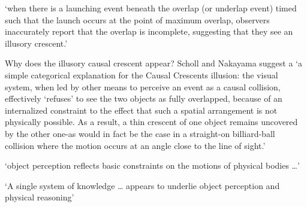 \documentclass[12pt]{extarticle}
\begin{document}
\begin{multicols*}{3}
‘when there is a launching event beneath the overlap (or underlap event) timed such that
the launch occurs at the point of maximum overlap, observers inaccurately report that
the overlap is incomplete, suggesting that they see an illusory crescent.’
\citep[p.\ 461]{Scholl:2004dx}

Why does the illusory causal crescent appear?  Scholl and Nakayama suggest a
‘a simple categorical explanation for the Causal Crescents illusion: the visual system,
when led by other means to perceive an event as a causal collision, effectively
‘refuses’ to see the two objects as fully overlapped, because of an internalized
constraint to the effect that such a spatial arrangement is not physically possible.
As a result, a thin crescent of one object remains uncovered by the other one-as
would in fact be the case in a straight-on billiard-ball collision where the motion
occurs at an angle close to the line of sight.’
\citep[p.\ 466]{Scholl:2004dx}

‘object perception reflects basic constraints on the motions of physical bodies …’
\citep[p.\ 51]{Spelke:1990jn}

‘A single system of  knowledge  … appears to underlie object perception and physical reasoning’
\citep[p.\ 175]{Carey:1994bh}












\footnotesize


\end{multicols*}
\end{document}
